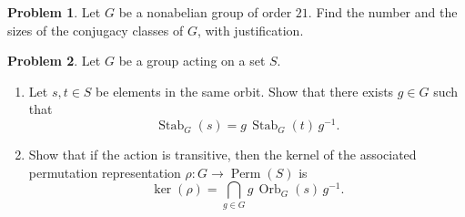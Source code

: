 \documentclass[11pt]{article}
\DeclareMathOperator{\Perm}{Perm}
\DeclareMathOperator{\Stab}{Stab}
\DeclareMathOperator{\Orb}{Orb}
\theoremstyle{definition}
\newtheorem{problem}{Problem}
\begin{document}
\begin{problem}
Let $G$ be a nonabelian group of order $21$. Find the number and the sizes of the conjugacy classes of $G$, with justification.
\end{problem}


\begin{problem}
	Let $G$ be a group acting on a set $S$.
	
\begin{enumerate}[label=(5.\arabic*)]	
\item Let $s, t \in S$ be elements in the same orbit. Show that there exists $g \in G$ such that
		$$\Stab_G(s) = g \, \Stab_G(t) \, g^{-1}.$$
\item Show that if the action is transitive, then the kernel of the associated permutation representation $\rho\!: G \to \Perm(S)$ is
$$\ker(\rho) = \bigcap_{g \in G} g \, \Orb_G(s) \, g^{-1}.$$
\end{enumerate}
\end{problem}
\end{document}
